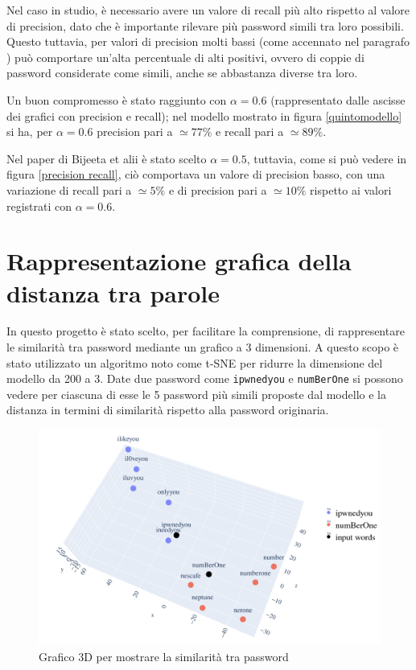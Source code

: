Nel caso in studio, è necessario avere un valore di recall più alto rispetto al valore di precision, dato che è importante rilevare più password simili tra loro possibili. Questo tuttavia, per valori di precision molti bassi (come accennato nel paragrafo   ) può comportare un'alta percentuale di alti positivi, ovvero di coppie di password considerate come simili, anche se abbastanza diverse tra loro.

Un buon compromesso è stato raggiunto con $\alpha = 0.6$ (rappresentato dalle ascisse dei grafici con precision e recall); nel modello mostrato in figura \ref{quintomodello} si ha, per $\alpha = 0.6$ precision pari a $\simeq 77\%$ e recall pari a $\simeq 89\%$.

Nel paper di Bijeeta et alii \cite{biijeta} è stato scelto $\alpha = 0.5$, tuttavia, come si può vedere in figura \ref{precision recall}, ciò comportava un valore di precision basso, con una variazione di recall pari a $\simeq 5\%$ e di precision pari a $\simeq 10\%$ rispetto ai valori registrati con $\alpha = 0.6$.
\section{Rappresentazione grafica della distanza tra parole}
In questo progetto è stato scelto, per facilitare la comprensione, di rappresentare le similarità tra password mediante un grafico a 3 dimensioni. A questo scopo è stato utilizzato un algoritmo noto come t-SNE per ridurre la dimensione del modello da 200 a 3.
Date due password come \texttt{ipwnedyou} e \texttt{numBerOne} si possono vedere per ciascuna di esse le 5 password più simili proposte dal modello e la distanza in termini di similarità rispetto alla password originaria.
\begin{figure}[H]
    \centering
    \includegraphics[width=15cm]{./immagini/3dplot.png}
    \caption{Grafico 3D per mostrare la similarità tra password}
    \label{3d}
\end{figure}
\label{ch:risultati}